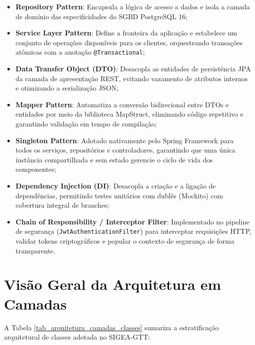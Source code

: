 \begin{itemize}
    \item \textbf{Repository Pattern}: Encapsula a lógica de acesso a dados e isola a camada de domínio das especificidades do SGBD PostgreSQL 16;
    \item \textbf{Service Layer Pattern}: Define a fronteira da aplicação e estabelece um conjunto de operações disponíveis para os clientes, orquestrando transações atômicas com a anotação \texttt{@Transactional};
    \item \textbf{Data Transfer Object (DTO)}: Desacopla as entidades de persistência JPA da camada de apresentação REST, evitando vazamento de atributos internos e otimizando a serialização JSON;
    \item \textbf{Mapper Pattern}: Automatiza a conversão bidirecional entre DTOs e entidades por meio da biblioteca MapStruct, eliminando código repetitivo e garantindo validação em tempo de compilação;
    \item \textbf{Singleton Pattern}: Adotado nativamente pelo Spring Framework para todos os serviços, repositórios e controladores, garantindo que uma única instância compartilhada e sem estado gerencie o ciclo de vida dos componentes;
    \item \textbf{Dependency Injection (DI)}: Desacopla a criação e a ligação de dependências, permitindo testes unitários com dublês (Mockito) com cobertura integral de branches;
    \item \textbf{Chain of Responsibility / Interceptor Filter}: Implementado no pipeline de segurança (\texttt{JwtAuthenticationFilter}) para interceptar requisições HTTP, validar tokens criptográficos e popular o contexto de segurança de forma transparente.
\end{itemize}

\section{Visão Geral da Arquitetura em Camadas}
\label{sec_arquitetura_camadas}

A Tabela \ref{tab_arquitetura_camadas_classes} sumariza a estratificação arquitetural de classes adotada no SIGEA-GTT:

